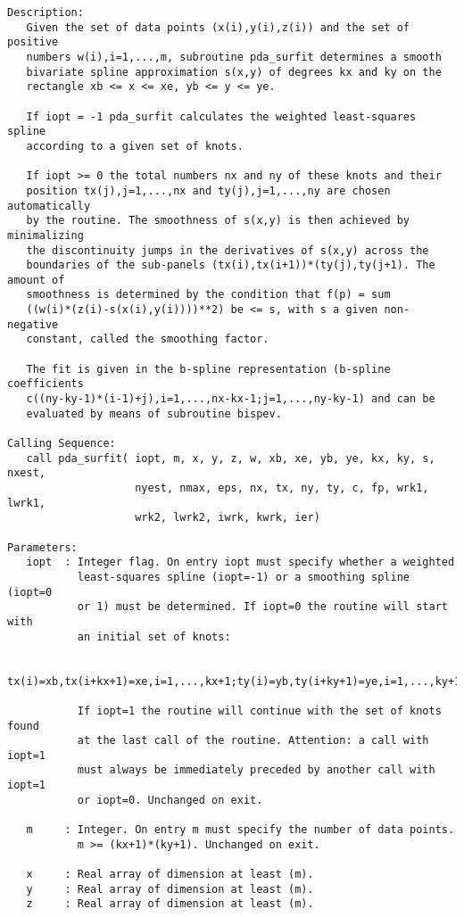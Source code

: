 \begin{verbatim}
Description:
   Given the set of data points (x(i),y(i),z(i)) and the set of positive
   numbers w(i),i=1,...,m, subroutine pda_surfit determines a smooth
   bivariate spline approximation s(x,y) of degrees kx and ky on the
   rectangle xb <= x <= xe, yb <= y <= ye.
   
   If iopt = -1 pda_surfit calculates the weighted least-squares spline
   according to a given set of knots.
   
   If iopt >= 0 the total numbers nx and ny of these knots and their
   position tx(j),j=1,...,nx and ty(j),j=1,...,ny are chosen automatically
   by the routine. The smoothness of s(x,y) is then achieved by minimalizing
   the discontinuity jumps in the derivatives of s(x,y) across the
   boundaries of the sub-panels (tx(i),tx(i+1))*(ty(j),ty(j+1). The amount of
   smoothness is determined by the condition that f(p) = sum
   ((w(i)*(z(i)-s(x(i),y(i))))**2) be <= s, with s a given non-negative
   constant, called the smoothing factor.
   
   The fit is given in the b-spline representation (b-spline coefficients
   c((ny-ky-1)*(i-1)+j),i=1,...,nx-kx-1;j=1,...,ny-ky-1) and can be
   evaluated by means of subroutine bispev.

Calling Sequence:
   call pda_surfit( iopt, m, x, y, z, w, xb, xe, yb, ye, kx, ky, s, nxest, 
                    nyest, nmax, eps, nx, tx, ny, ty, c, fp, wrk1, lwrk1, 
                    wrk2, lwrk2, iwrk, kwrk, ier)

Parameters:
   iopt  : Integer flag. On entry iopt must specify whether a weighted
           least-squares spline (iopt=-1) or a smoothing spline (iopt=0
           or 1) must be determined. If iopt=0 the routine will start with 
           an initial set of knots:

   tx(i)=xb,tx(i+kx+1)=xe,i=1,...,kx+1;ty(i)=yb,ty(i+ky+1)=ye,i=1,...,ky+1. 

           If iopt=1 the routine will continue with the set of knots found 
           at the last call of the routine. Attention: a call with iopt=1 
           must always be immediately preceded by another call with iopt=1 
           or iopt=0. Unchanged on exit.

   m     : Integer. On entry m must specify the number of data points.
           m >= (kx+1)*(ky+1). Unchanged on exit.

   x     : Real array of dimension at least (m).
   y     : Real array of dimension at least (m).
   z     : Real array of dimension at least (m).


\end{verbatim}
